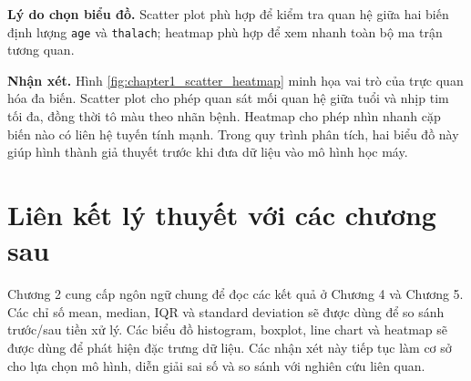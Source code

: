 \textbf{Lý do chọn biểu đồ.} Scatter plot phù hợp để kiểm tra quan hệ giữa hai biến định lượng \texttt{age} và \texttt{thalach}; heatmap phù hợp để xem nhanh toàn bộ ma trận tương quan.

\textbf{Nhận xét.} Hình \ref{fig:chapter1_scatter_heatmap} minh họa vai trò của trực quan hóa đa biến. Scatter plot cho phép quan sát mối quan hệ giữa tuổi và nhịp tim tối đa, đồng thời tô màu theo nhãn bệnh. Heatmap cho phép nhìn nhanh cặp biến nào có liên hệ tuyến tính mạnh. Trong quy trình phân tích, hai biểu đồ này giúp hình thành giả thuyết trước khi đưa dữ liệu vào mô hình học máy.

\section{Liên kết lý thuyết với các chương sau}

Chương 2 cung cấp ngôn ngữ chung để đọc các kết quả ở Chương 4 và Chương 5. Các chỉ số mean, median, IQR và standard deviation sẽ được dùng để so sánh trước/sau tiền xử lý. Các biểu đồ histogram, boxplot, line chart và heatmap sẽ được dùng để phát hiện đặc trưng dữ liệu. Các nhận xét này tiếp tục làm cơ sở cho lựa chọn mô hình, diễn giải sai số và so sánh với nghiên cứu liên quan.

